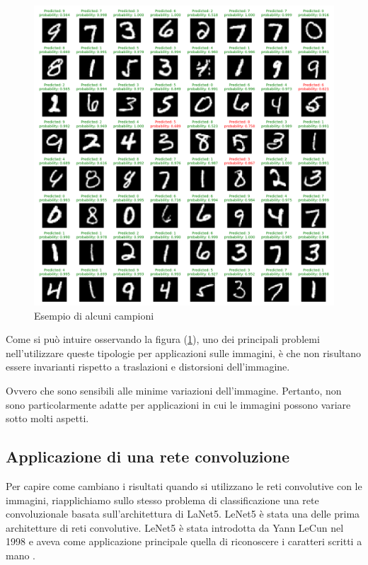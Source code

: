 \begin{figure}[H]
    \centering
    \includegraphics[width=1.0\textwidth]{Immagini/Grafici/esempio_MNIST_processato.png}
    \caption{Esempio di alcuni campioni}
    \label{fig:MNIST_processato}
\end{figure}

Come si può intuire osservando la figura (\ref{fig:MNIST_processato}), uno dei principali 
problemi nell'utilizzare queste tipologie per applicazioni sulle immagini, è che 
non risultano essere invarianti rispetto a traslazioni e distorsioni dell’immagine.

Ovvero che sono sensibili alle minime variazioni dell'immagine. Pertanto, non sono 
particolarmente adatte per applicazioni in cui le immagini possono variare sotto 
molti aspetti.


\subsection{Applicazione di una rete convoluzione}
Per capire come cambiano i risultati quando si utilizzano le reti convolutive 
con le immagini, riapplichiamo sullo stesso problema di classificazione una 
rete convoluzionale basata sull'architettura di LaNet5.
LeNet5 è stata una delle prima architetture di reti convolutive. LeNet5 è stata 
introdotta da Yann LeCun nel 1998 e aveva come applicazione principale 
quella di riconoscere i caratteri scritti a mano \cite{LaNet5}.

